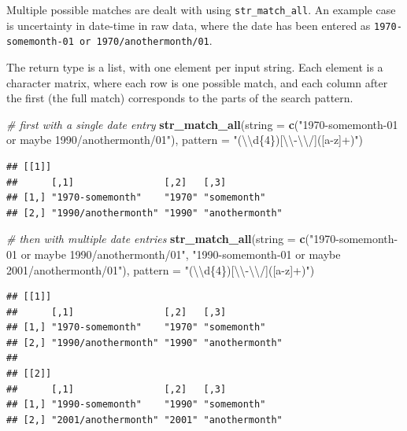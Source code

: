 \documentclass[]{book}
\newenvironment{Shaded}{}{}
\newcommand{\CharTok}[1]{\textcolor[rgb]{0.25,0.44,0.63}{#1}}
\newcommand{\CommentTok}[1]{\textcolor[rgb]{0.38,0.63,0.69}{\textit{#1}}}
\newcommand{\DataTypeTok}[1]{\textcolor[rgb]{0.56,0.13,0.00}{#1}}
\newcommand{\KeywordTok}[1]{\textcolor[rgb]{0.00,0.44,0.13}{\textbf{#1}}}
\newcommand{\NormalTok}[1]{#1}
\newcommand{\StringTok}[1]{\textcolor[rgb]{0.25,0.44,0.63}{#1}}
\begin{document}
Multiple possible matches are dealt with using \texttt{str\_match\_all}. An example case is uncertainty in date-time in raw data, where the date has been entered as \texttt{1970-somemonth-01\ or\ 1970/anothermonth/01}.

The return type is a list, with one element per input string. Each element is a character matrix, where each row is one possible match, and each column after the first (the full match) corresponds to the parts of the search pattern.

\begin{Shaded}
\begin{Highlighting}[]
\CommentTok{# first with a single date entry}
\KeywordTok{str_match_all}\NormalTok{(}\DataTypeTok{string =} \KeywordTok{c}\NormalTok{(}\StringTok{"1970-somemonth-01 or maybe 1990/anothermonth/01"}\NormalTok{),}
              \DataTypeTok{pattern =} \StringTok{"(}\CharTok{\textbackslash{}\textbackslash{}}\StringTok{d\{4\})[}\CharTok{\textbackslash{}\textbackslash{}}\StringTok{-}\CharTok{\textbackslash{}\textbackslash{}}\StringTok{/]([a-z]+)"}\NormalTok{)}
\end{Highlighting}
\end{Shaded}

\begin{verbatim}
## [[1]]
##      [,1]                [,2]   [,3]          
## [1,] "1970-somemonth"    "1970" "somemonth"   
## [2,] "1990/anothermonth" "1990" "anothermonth"
\end{verbatim}

\begin{Shaded}
\begin{Highlighting}[]
\CommentTok{# then with multiple date entries}
\KeywordTok{str_match_all}\NormalTok{(}\DataTypeTok{string =} \KeywordTok{c}\NormalTok{(}\StringTok{"1970-somemonth-01 or maybe 1990/anothermonth/01"}\NormalTok{,}
                         \StringTok{"1990-somemonth-01 or maybe 2001/anothermonth/01"}\NormalTok{),}
              \DataTypeTok{pattern =} \StringTok{"(}\CharTok{\textbackslash{}\textbackslash{}}\StringTok{d\{4\})[}\CharTok{\textbackslash{}\textbackslash{}}\StringTok{-}\CharTok{\textbackslash{}\textbackslash{}}\StringTok{/]([a-z]+)"}\NormalTok{)}
\end{Highlighting}
\end{Shaded}

\begin{verbatim}
## [[1]]
##      [,1]                [,2]   [,3]          
## [1,] "1970-somemonth"    "1970" "somemonth"   
## [2,] "1990/anothermonth" "1990" "anothermonth"
## 
## [[2]]
##      [,1]                [,2]   [,3]          
## [1,] "1990-somemonth"    "1990" "somemonth"   
## [2,] "2001/anothermonth" "2001" "anothermonth"
\end{verbatim}
\end{document}
